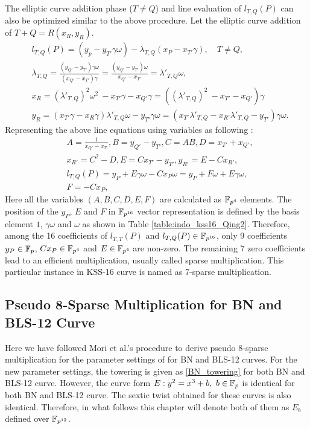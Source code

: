 The elliptic curve addition phase \texorpdfstring{($T\neq Q$)}{} and line evaluation of $ l_{T,Q}(P)$ can also be optimized similar to the above procedure. Let the elliptic curve addition of $T+Q = R(x_R, y_R)$.
\begin{eqnarray}
&  l_{T,Q}(P) = (y_p-y_{T'} \gamma \omega)- \lambda_{T,Q}(x_P-x_{T'}\gamma),  \quad \text{$T \neq Q$,} \nonumber \\
&\lambda_{T,Q}= \frac{( y_{Q'}-y_{T'})\gamma \omega}{( x_{Q'}-x_{T'})\gamma} = \frac{( y_{Q'}-y_{T'}) \omega}{x_{Q'}-x_{T'}} = \lambda'_{T,Q} \omega, \nonumber\\
& x_{R} = (\lambda'_{T,Q})^2 \omega^2 \ - x_{T'}\gamma -  x_{Q'}\gamma = ((\lambda'_{T,Q})^2  \ - x_{T'} -x_{Q'})\gamma \nonumber \\
& y_{R}= (x_{T'} \gamma-x_{R} \gamma)\lambda'_{T,Q} \omega-y_{T'}\gamma\omega = (x_{T'}\lambda'_{T,Q} -x_{R'}\lambda'_{T,Q}-y_{T'})\gamma \omega \nonumber.
\end{eqnarray}
Representing the above line equations using variables as following :
\begin{eqnarray}
&A=\frac{1}{x_{Q'}-x_{T'}}, B=y_{Q'}-y_{T'}, C=AB, D=x_{T'}+x_{Q'},\nonumber\\
& x_{R'}=C^2-D, E= Cx_{T'}-y_{T'}, y_{R'}=E-Cx_{R'},\nonumber\\
&l_{T,Q}(P)= y_P+E \gamma \omega-Cx_P\omega = y_P+F\omega+E \gamma \omega, \label{indo_kss16_sparse_add}\\
& F=-Cx_P,  \nonumber
\end{eqnarray}
Here all the variables $(A,B,C, D, E, F)$  are calculated as $\mathbb{F}_{p^4}$ elements.
The  position of the $y_P$, $E$ and $F$ in $\mathbb{F}_{p^{16}}$ vector representation is defined by the basis element $1$, $\gamma\omega $ and $\omega$ as shown in Table \ref{table:indo_kss16_Qing2}. 
Therefore,  among the 16 coefficients of  $l_{T,T}(P)$ and $l_{T,Q}(P)\in \mathbb{F}_{p^{16}}$, only 9 coefficients $y_P\in {\mathbb{F}}_{p}$, $Cx_P\in \mathbb{F}_{p^4}$ and $E\in \mathbb{F}_{p^4}$ are  non-zero. The remaining 7 zero coefficients lead to an efficient multiplication, usually called sparse multiplication. This particular instance in KSS-16 curve is named as 7-sparse multiplication.


\subsection{Pseudo 8-Sparse Multiplication for BN and BLS-12 Curve}  
Here we have followed Mori et al.'s \cite{PAIRING:MANS13} procedure to derive pseudo 8-sparse multiplication for the parameter settings of \cite{EPRINT:BarDuq17} for BN and BLS-12 curves. 
For the new parameter settings, the towering is given as \eqref{BN_towering} for both BN and BLS-12 curve.
However, the curve form $E:y^2=x^3+b, ~b \in {\mathbb{F}}_{p}$ is identical for both BN and BLS-12 curve.
The sextic twist obtained for these curves is also identical.
Therefore, in what follows this chapter will denote both of them as $E_b$ defined over $\mathbb{F}_{p^{12}}$.

